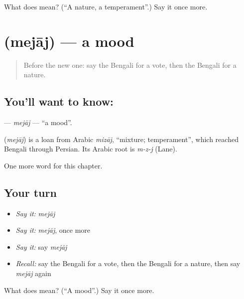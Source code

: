 \begin{tcolorbox}[breakable,colback=teal!4,colframe=teal!35!black,title={Before you move on}]
What does  mean? (\textquotedblleft{}A nature, a temperament\textquotedblright{}.) Say it once more.
\end{tcolorbox}
\section[\texorpdfstring{\bn{মেজাজ} (mejāj)}{মেজাজ (mejāj)}]{ (mejāj) — a mood}

\label{lesson:BN-C203-mejaj}



\begin{quote}
Before the new one: say the Bengali for a vote, then the Bengali for a nature.
\end{quote}

\subsection*{You'll want to know: }
\textbf{} — \emph{mejāj} — \textquotedblleft{}a mood\textquotedblright{}.

\begin{cousinweb}
\textbf{} (\emph{mejāj}) is a loan from Arabic \emph{mizāj}, \textquotedblleft{}mixture; temperament\textquotedblright{}, which reached Bengali through Persian. Its Arabic root is \emph{m-z-j} (Lane).
\end{cousinweb}

\begin{grammarlens}[title={What you've built}]
One more word for this chapter.
\end{grammarlens}

\subsection*{Your turn}
\begin{itemize}
\raggedright
  \item \emph{Say it:} \emph{mejāj}
  \item \emph{Say it:} \emph{mejāj}, once more
  \item \emph{Say it:} say \emph{mejāj}
  \item \emph{Recall:} say the Bengali for a vote, then the Bengali for a nature, then say \emph{mejāj} again
\end{itemize}

\begin{tcolorbox}[breakable,colback=teal!4,colframe=teal!35!black,title={Before you move on}]
What does  mean? (\textquotedblleft{}A mood\textquotedblright{}.) Say it once more.
\end{tcolorbox}

